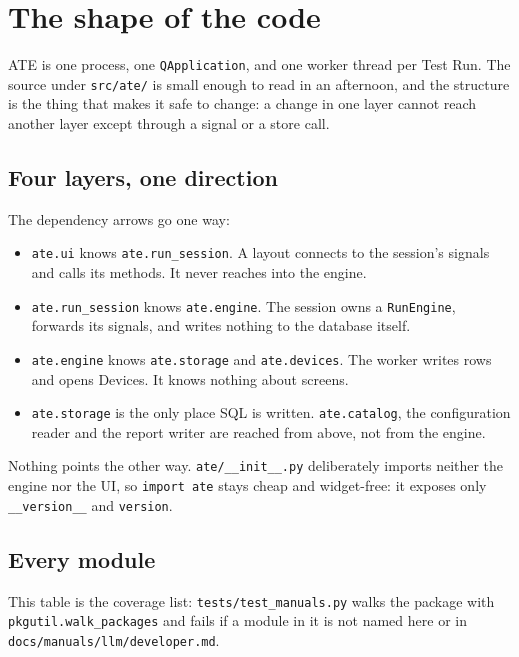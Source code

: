 \chapter{The shape of the code}\label{ch:shape}

ATE is one process, one \texttt{QApplication}, and one worker thread per Test Run. The source under
\texttt{src/ate/} is small enough to read in an afternoon, and the structure is the thing that makes it
safe to change: a change in one layer cannot reach another layer except through a signal or a store
call.

\section{Four layers, one direction}

The dependency arrows go one way:

\begin{itemize}
  \item \texttt{ate.ui} knows \texttt{ate.run\_session}. A layout connects to the session's signals and
    calls its methods. It never reaches into the engine.
  \item \texttt{ate.run\_session} knows \texttt{ate.engine}. The session owns a \texttt{RunEngine},
    forwards its signals, and writes nothing to the database itself.
  \item \texttt{ate.engine} knows \texttt{ate.storage} and \texttt{ate.devices}. The worker writes rows
    and opens Devices. It knows nothing about screens.
  \item \texttt{ate.storage} is the only place SQL is written. \texttt{ate.catalog}, the configuration
    reader and the report writer are reached from above, not from the engine.
\end{itemize}

Nothing points the other way. \texttt{ate/\_\_init\_\_.py} deliberately imports neither the engine nor the
UI, so \texttt{import ate} stays cheap and widget-free: it exposes only \texttt{\_\_version\_\_} and
\texttt{version}.

\section{Every module}

This table is the coverage list: \texttt{tests/\allowbreak{}test\_\allowbreak{}manuals.py} walks the package with
\texttt{pkgutil.walk\_\allowbreak{}packages} and fails if a module in it is not named here or in
\texttt{docs/\allowbreak{}manuals/\allowbreak{}llm/\allowbreak{}developer.md}.

